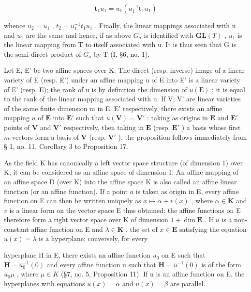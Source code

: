 \[
\mathbf {t} _ {1} u _ {1} = u _ {1} (u _ {1} ^ {- 1} \mathbf {t} _ {1} u _ {1})
\]

whence \(u_{2}=u_{1}\) , \(t_{2}=u_{1}^{-1}t_{1}u_{1}\) . Finally, the linear mappings associated with u and \(u_{1}\) are the same and hence, if as above \(G_{a}\) is identified with \(\mathbf{GL}(T)\) , \(u_{1}\) is the linear mapping from T to itself associated with u. It is thus seen that G is the semi-direct product of \(G_{a}\) by T (I, §6, no. 1).

Let E, E' be two affine spaces over K. The direct (resp. inverse) image of a linear variety of E (resp. E') under an affine mapping u of E into E' is a linear variety of E' (resp. E); the rank of u is by definition the dimension of \(u(\mathrm{E})\) ; it is equal to the rank of the linear mapping associated with u. If V, V' are linear varieties of the same finite dimension m in E, E' respectively, there exists an affine mapping \(u\) of \(\mathbf{E}\) into \(\mathbf{E}'\) such that \(u(\mathbf{V}) = \mathbf{V}'\) : taking as origins in \(\mathbf{E}\) and \(\mathbf{E}'\) points of \(\mathbf{V}\) and \(\mathbf{V}'\) respectively, then taking in \(\mathbf{E}\) (resp. \(\mathbf{E}'\) ) a basis whose first \(m\) vectors form a basis of \(\mathbf{V}\) (resp. \(\mathbf{V}'\) ), the proposition follows immediately from § 1, no. 11, Corollary 3 to Proposition 17.

As the field K has canonically a left vector space structure (of dimension 1) over K, it can be considered as an affine space of dimension 1. An affine mapping of an affine space D (over K) into the affine space K is also called an affine linear function (or an affine function). If a point \(a\) is taken as origin in E, every affine function on E can then be written uniquely as \(x \mapsto \alpha + v(x)\) , where \(\alpha \in \mathbf{K}\) and \(v\) is a linear form on the vector space E thus obtained; the affine functions on E therefore form a right vector space over K of dimension \(1 + \dim \mathbf{E}\) . If \(u\) is a non-constant affine function on E and \(\lambda \in \mathbf{K}\) , the set of \(x \in \mathbf{E}\) satisfying the equation \(u(x) = \lambda\) is a hyperplane; conversely, for every

hyperplane H in E, there exists an affine function \(u_{0}\) on E such that \(\mathbf{H} = \bar{u}_{0}^{-1}(0)\) and every affine function u such that \(\mathbf{H} = \bar{u}^{-1}(0)\) is of the form \(u_{0}\mu\) , where \(\mu \in K\) (§7, no. 5, Proposition 11). If u is an affine function on E, the hyperplanes with equations \(u(x) = \alpha\) and \(u(x) = \beta\) are parallel.


